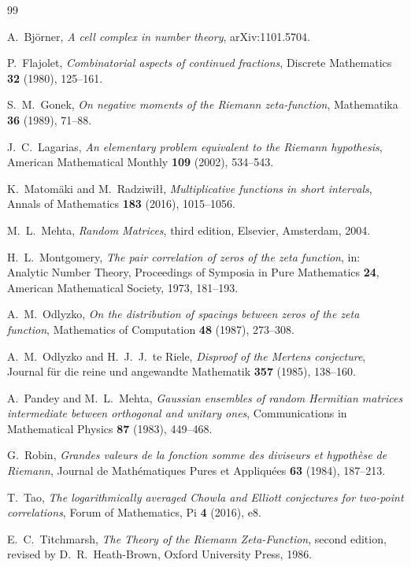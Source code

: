 \documentclass[11pt]{amsart}
\numberwithin{equation}{section}
\theoremstyle{plain}
\theoremstyle{definition}
\theoremstyle{remark}
\begin{document}
\begin{thebibliography}{99}

A.~Bj\"orner,
\emph{A cell complex in number theory},
arXiv:1101.5704.

P.~Flajolet,
\emph{Combinatorial aspects of continued fractions},
Discrete Mathematics \textbf{32} (1980), 125--161.

S.~M.~Gonek,
\emph{On negative moments of the Riemann zeta-function},
Mathematika \textbf{36} (1989), 71--88.

J.~C.~Lagarias,
\emph{An elementary problem equivalent to the Riemann hypothesis},
American Mathematical Monthly \textbf{109} (2002), 534--543.

K.~Matom\"aki and M.~Radziwi\l{}\l{},
\emph{Multiplicative functions in short intervals},
Annals of Mathematics \textbf{183} (2016), 1015--1056.

M.~L.~Mehta,
\emph{Random Matrices}, third edition,
Elsevier, Amsterdam, 2004.

H.~L.~Montgomery,
\emph{The pair correlation of zeros of the zeta function},
in: Analytic Number Theory,
Proceedings of Symposia in Pure Mathematics \textbf{24},
American Mathematical Society, 1973, 181--193.

A.~M.~Odlyzko,
\emph{On the distribution of spacings between zeros of the zeta
function},
Mathematics of Computation \textbf{48} (1987), 273--308.

A.~M.~Odlyzko and H.~J.~J.~te Riele,
\emph{Disproof of the Mertens conjecture},
Journal f\"ur die reine und angewandte Mathematik \textbf{357} (1985),
138--160.

A.~Pandey and M.~L.~Mehta,
\emph{Gaussian ensembles of random Hermitian matrices intermediate
between orthogonal and unitary ones},
Communications in Mathematical Physics \textbf{87} (1983), 449--468.

G.~Robin,
\emph{Grandes valeurs de la fonction somme des diviseurs et hypoth\`ese
de Riemann},
Journal de Math\'ematiques Pures et Appliqu\'ees \textbf{63} (1984),
187--213.

T.~Tao,
\emph{The logarithmically averaged Chowla and Elliott conjectures for
two-point correlations},
Forum of Mathematics, Pi \textbf{4} (2016), e8.

E.~C.~Titchmarsh,
\emph{The Theory of the Riemann Zeta-Function}, second edition,
revised by D.~R.~Heath-Brown,
Oxford University Press, 1986.

\end{thebibliography}

\label{sec:bibliography}
\end{document}
